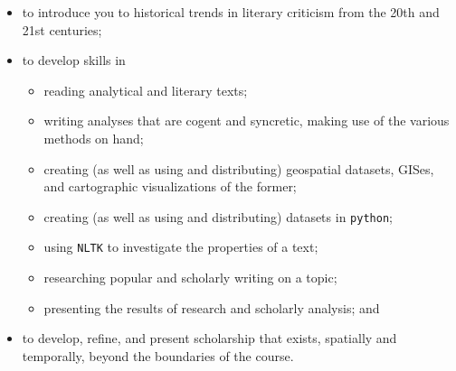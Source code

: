 \begin{itemize}

	\item to introduce you to historical trends in literary criticism from the 20th and 21st centuries; 

  \item to develop skills in 

    \begin{itemize}

			\item reading analytical and literary texts;

			\item writing analyses that are cogent and syncretic, making use of the
various methods on hand;

			\item creating (as well as using and distributing) geospatial datasets,
GISes, and cartographic visualizations of the former; 

      \item creating (as well as using and distributing) datasets in \texttt{python};

      \item using \texttt{NLTK} to investigate the properties of a text;
        
      \item researching popular and scholarly writing on a topic;
        
      \item presenting the results of research and scholarly analysis; and

    \end{itemize}

	\item to develop, refine, and present scholarship that exists, spatially and
temporally, beyond the boundaries of the course.

\end{itemize}
